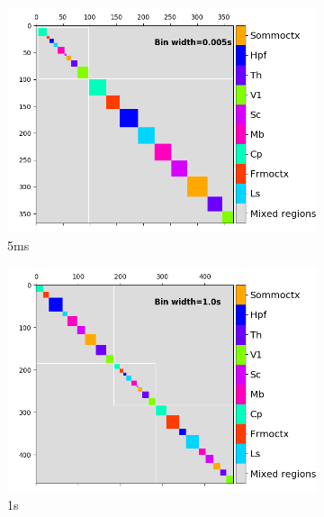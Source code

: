\begin{figure}[p]
\begin{subfigure}[h]{0.5\linewidth}
    \end{subfigure}
    \begin{subfigure}[h]{0.5\linewidth}
      \includegraphics[width=\linewidth]{figures/eight_probe/Krebs_0p005_regional_cluster_map_total_negative.png}
      \caption{5ms}
      \label{fig:negative_regional_cluster_map_5ms}
    \end{subfigure}
    \begin{subfigure}[h]{0.5\linewidth}
      \includegraphics[width=\linewidth]{figures/eight_probe/Krebs_1p0_regional_cluster_map_total_negative.png}
      \caption{1s}
      \label{fig:negative_regional_cluster_map_1s}
    \end{subfigure}
    \begin{subfigure}[h]{0.5\linewidth}

\end{subfigure}
\end{figure}
